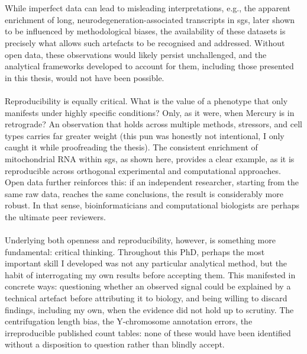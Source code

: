 \\
\\
While imperfect data can lead to misleading interpretations, e.g., the apparent enrichment of long, neurodegeneration-associated transcripts in \glspl{sg}\cite{sato_stress_2023}, later shown to be influenced by methodological biases, the availability of these datasets is precisely what allows such artefacts to be recognised and addressed. Without open data, these observations would likely persist unchallenged, and the analytical frameworks developed to account for them, including those presented in this thesis, would not have been possible.
\\
\\
Reproducibility is equally critical. What is the value of a phenotype that only manifests under highly specific conditions? Only, as it were, when Mercury is in retrograde? An observation that holds across multiple methods, stressors, and cell types carries far greater weight (this pun was honestly not intentional, I only caught it while proofreading the thesis). The consistent enrichment of mitochondrial RNA within \glspl{sg}, as shown here, provides a clear example, as it is reproducible across orthogonal experimental and computational approaches. Open data further reinforces this: if an independent researcher, starting from the same raw data, reaches the same conclusions, the result is considerably more robust. In that sense, bioinformaticians and computational biologists are perhaps the ultimate peer reviewers.
\\
\\
Underlying both openness and reproducibility, however, is something more fundamental: critical thinking. Throughout this PhD, perhaps the most important skill I developed was not any particular analytical method, but the habit of interrogating my own results before accepting them. This manifested in concrete ways: questioning whether an observed signal could be explained by a technical artefact before attributing it to biology, and being willing to discard findings, including my own, when the evidence did not hold up to scrutiny. The centrifugation length bias, the Y-chromosome annotation errors, the irreproducible published count tables: none of these would have been identified without a disposition to question rather than blindly accept.
\\
\\
